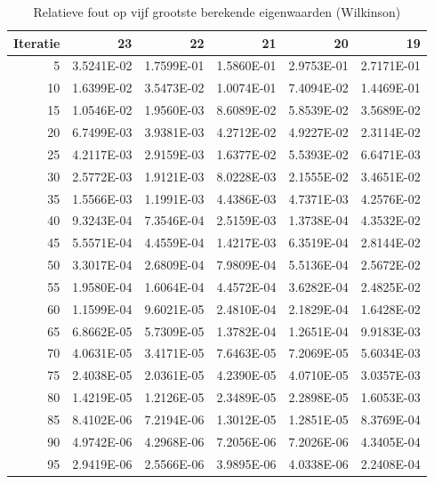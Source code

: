 \documentclass[a4paper, 12pt, titlepage]{report}
\begin{document}
\begin{center}
 \begin{table}
  \begin{tabular}{r||r|r|r|r|r}
  Iteratie & 23&22&21&20&19\\
  \hline
  5	&	3.5241E-02	&	1.7599E-01	&	1.5860E-01	&	2.9753E-01	&	2.7171E-01	\\
10	&	1.6399E-02	&	3.5473E-02	&	1.0074E-01	&	7.4094E-02	&	1.4469E-01	\\
15	&	1.0546E-02	&	1.9560E-03	&	8.6089E-02	&	5.8539E-02	&	3.5689E-02	\\
20	&	6.7499E-03	&	3.9381E-03	&	4.2712E-02	&	4.9227E-02	&	2.3114E-02	\\
25	&	4.2117E-03	&	2.9159E-03	&	1.6377E-02	&	5.5393E-02	&	6.6471E-03	\\
30	&	2.5772E-03	&	1.9121E-03	&	8.0228E-03	&	2.1555E-02	&	3.4651E-02	\\
35	&	1.5566E-03	&	1.1991E-03	&	4.4386E-03	&	4.7371E-03	&	4.2576E-02	\\
40	&	9.3243E-04	&	7.3546E-04	&	2.5159E-03	&	1.3738E-04	&	4.3532E-02	\\
45	&	5.5571E-04	&	4.4559E-04	&	1.4217E-03	&	6.3519E-04	&	2.8144E-02	\\
50	&	3.3017E-04	&	2.6809E-04	&	7.9809E-04	&	5.5136E-04	&	2.5672E-02	\\
55	&	1.9580E-04	&	1.6064E-04	&	4.4572E-04	&	3.6282E-04	&	2.4825E-02	\\
60	&	1.1599E-04	&	9.6021E-05	&	2.4810E-04	&	2.1829E-04	&	1.6428E-02	\\
65	&	6.8662E-05	&	5.7309E-05	&	1.3782E-04	&	1.2651E-04	&	9.9183E-03	\\
70	&	4.0631E-05	&	3.4171E-05	&	7.6463E-05	&	7.2069E-05	&	5.6034E-03	\\
75	&	2.4038E-05	&	2.0361E-05	&	4.2390E-05	&	4.0710E-05	&	3.0357E-03	\\
80	&	1.4219E-05	&	1.2126E-05	&	2.3489E-05	&	2.2898E-05	&	1.6053E-03	\\
85	&	8.4102E-06	&	7.2194E-06	&	1.3012E-05	&	1.2851E-05	&	8.3769E-04	\\
90	&	4.9742E-06	&	4.2968E-06	&	7.2056E-06	&	7.2026E-06	&	4.3405E-04	\\
95	&	2.9419E-06	&	2.5566E-06	&	3.9895E-06	&	4.0338E-06	&	2.2408E-04	\\


  \end{tabular}
\caption{Relatieve fout op vijf grootste berekende eigenwaarden (Wilkinson)}
\label{errorWilkinson}
 \end{table}

\end{center}
\end{document}

